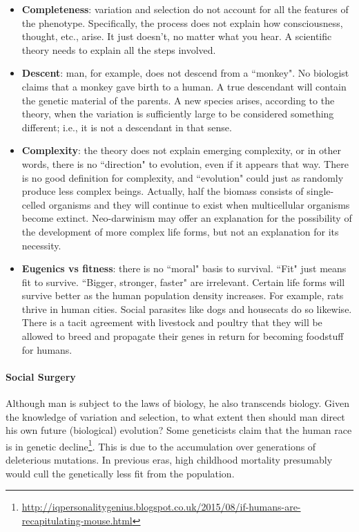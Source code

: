 \begin{itemize}
\item \textbf{Completeness}: variation and selection do not account for all the features of the phenotype. Specifically, the process does not explain how consciousness, thought, etc., arise. It just doesn't, no matter what you hear. A scientific theory needs to explain all the steps involved. 
\item \textbf{Descent}: man, for example, does not descend from a ``monkey". No biologist claims that a monkey gave birth to a human. A true descendant will contain the genetic material of the parents. A new species arises, according to the theory, when the variation is sufficiently large to be considered something different; i.e., it is not a descendant in that sense. 
\item \textbf{Complexity}: the theory does not explain emerging complexity, or in other words, there is no ``direction" to evolution, even if it appears that way. There is no good definition for complexity, and ``evolution" could just as randomly produce less complex beings. Actually, half the biomass consists of single-celled organisms and they will continue to exist when multicellular organisms become extinct. Neo-darwinism may offer an explanation for the possibility of the development of more complex life forms, but not an explanation for its necessity. 
\item \textbf{Eugenics vs fitness}: there is no ``moral" basis to survival. ``Fit" just means fit to survive. ``Bigger, stronger, faster" are irrelevant. Certain life forms will survive better as the human population density increases. For example, rats thrive in human cities. Social parasites like dogs and housecats do so likewise. There is a tacit agreement with livestock and poultry that they will be allowed to breed and propagate their genes in return for becoming foodstuff for humans. 
\end{itemize}
\paragraph{Social Surgery}
Although man is subject to the laws of biology, he also transcends biology. Given the knowledge of variation and selection, to what extent then should man direct his own future (biological) evolution? Some geneticists claim that the human race is in genetic decline\footnote{\url{http://iqpersonalitygenius.blogspot.co.uk/2015/08/if-humans-are-recapitulating-mouse.html}}. This is due to the accumulation over generations of deleterious mutations. In previous eras, high childhood mortality presumably would cull the genetically less fit from the population.

